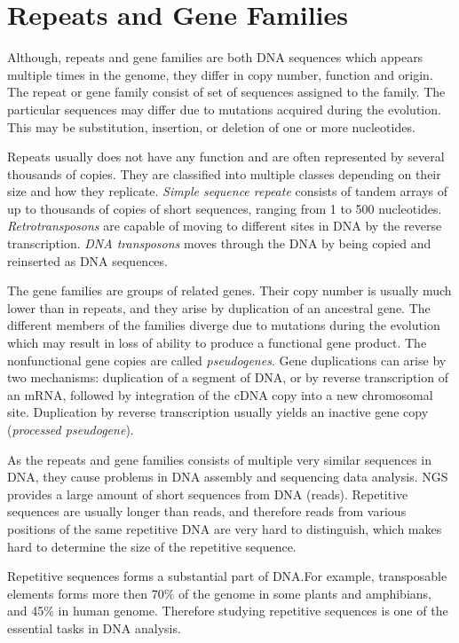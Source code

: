 \chapter[Rep.\ and Gene Fam.]{Repeats and Gene Families}\label{chap:repeatsfamilies}

Although, repeats and gene families are both DNA sequences which appears multiple times in the genome, they differ in copy number, function and origin.
The repeat or gene family consist of set of sequences assigned to the family. The particular sequences may differ due to mutations acquired during the evolution. This may be substitution, insertion, or deletion of one or more nucleotides.

Repeats usually does not have any function and are often represented by several thousands of copies\cite{cell}. They are classified into multiple classes depending on their size and how they replicate.
\emph{Simple sequence repeate} consists of tandem arrays of up to thousands of copies of short sequences, ranging from 1 to 500 nucleotides.
\emph{Retrotransposons} are capable of moving to different sites in DNA by the reverse transcription.
\emph{DNA transposons} moves through the DNA by being copied and reinserted as DNA sequences\cite{cell}.

The gene families are groups of related genes.
Their copy number is usually much lower than in repeats, and they arise by duplication of an ancestral gene. The different members of the families diverge due to mutations during the evolution which may result in loss of ability to produce a functional gene product. The nonfunctional gene copies are called \emph{pseudogenes}.
Gene duplications can arise by two mechanisms: duplication of a segment of DNA, or by reverse transcription of an mRNA, followed by integration of the cDNA copy into a new chromosomal site.
Duplication by reverse transcription usually yields an inactive gene copy (\emph{processed pseudogene}).

As the repeats and gene families consists of multiple very similar sequences in DNA, they cause problems in DNA assembly and sequencing data analysis. NGS provides a large amount of short sequences from DNA (reads). Repetitive sequences are usually longer than reads, and therefore reads from various positions of the same repetitive DNA are very hard to distinguish, which makes hard to determine the size of the repetitive sequence.

Repetitive sequences forms a substantial part of DNA.\@ For example,
transposable elements forms more then 70\% of the genome in some plants and amphibians, and 45\% in human genome\cite{biemont2006genetics}.
Therefore studying repetitive sequences is one of the essential tasks in DNA analysis.


